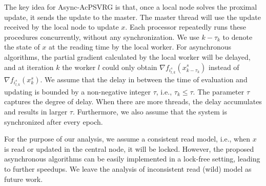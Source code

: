 \documentclass[10pt, conference, compsocconf]{IEEEtran}
\newcommand{\Initialize}{\textbf{Initialize:}{\,}}
\newcommand{\Input}{\textbf{Input:}{\,}}
\newcommand{\Output}{\textbf{Output:}{\,}}
\theoremstyle{definition}
\theoremstyle{remark}
\begin{document}
The key
idea for Async-AcPSVRG is that, once a local node solves the proximal update, it  sends  the update to the master. The master thread will use the update received by the local node to update $x$. Each processor repeatedly runs these procedures concurrently, without any synchronization. We use $k-\tau_k$ to denote the state of $x$ at the reading time by the local worker. For asynchronous algorithms, the partial gradient calculated by the local worker will be delayed, and at iteration $k$ the worker $l$ could only obtain $\nabla f_{i_{l,k}^s}(x_{k-\tau_k}^s)$ instead of $\nabla f_{i_{l,k}^s}(x_{k}^s)$. We assume that the delay in between the time of evaluation and updating is bounded by a non-negative integer $\tau$, i.e., $\tau_k\leq \tau$. The parameter $\tau$ captures the degree of delay. When there are more threads, the delay accumulates and results in larger $\tau$. Furthermore, we also assume that the system is synchronized after every epoch.

For the purpose of our analysis, we assume a consistent read model, i.e., when $x$ is read or updated in the central node, it will be locked. However, the proposed asynchronous algorithms can be easily implemented in a lock-free setting, leading to further speedups. We leave the analysis of inconsistent read (wild) model as future work.


\end{document}
